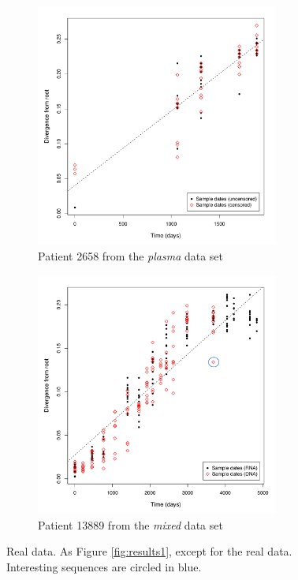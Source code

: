 \documentclass[12pt]{article}
\begin{document}
\clearpage

\begin{figure}[p]
	\centering
	\begin{subfigure}[ht]{8cm}
		\includegraphics[width=8cm]{figures/ancre.pdf}
		\caption{Patient 2658 from the \emph{plasma} data set}
		\label{fig:resultsancre}
	\end{subfigure}
	\begin{subfigure}[ht]{8cm}
		\includegraphics[width=8cm]{figures/lanl.pdf}
		\caption{Patient 13889 from the \emph{mixed} data set}
		\label{fig:resultslanl}
	\end{subfigure}
	\caption[Examples]{
	{Real data.}
	As Figure \ref{fig:results1}, except for the real data.
	Interesting sequences are circled in blue.
	}
	\label{fig:results2}
\end{figure}

\clearpage
\end{document}
